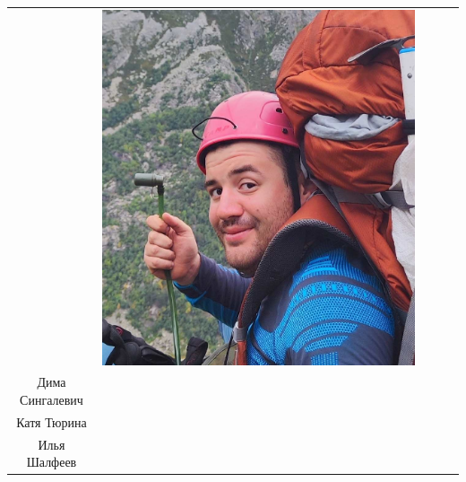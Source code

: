 \documentclass[
11pt, %
]{beamer}
\newcommand\rozhasize{0.17\textwidth}
\newcommand\namesize{0.18\textwidth}
\begin{document}
\begin{frame}
\begin{tabular}{ccccc}
\begin{minipage}{\rozhasize}
	\end{minipage} &
	\begin{minipage}{\rozhasize}
		\includegraphics[width=\textwidth]{../pics/portraits/ilya_sh}
	\end{minipage} & 
	\begin{minipage}{\namesize}
		{\tiny
			Дима Дёмушкин\\
			Дима Сингалевич\\
			Катя Тюрина\\
			Илья Шалфеев}
	\end{minipage} \\
	

\end{tabular}
\end{frame}
\end{document}

